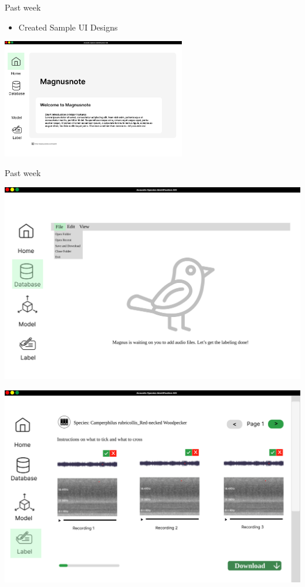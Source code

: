 \begin{frame}{Past week} 
    \begin{itemize}
        \item Created Sample UI Designs
    \end{itemize}  
    \centering
    \includegraphics[width=0.6\textwidth]{sampleui1.png}  
\end{frame}

\begin{frame}{Past week} 
    \begin{minipage}[b]{0.45\textwidth}
        \centering
        \includegraphics[width=\textwidth]{sampleui2.png}  
    \end{minipage}
    \hspace{0.05\textwidth}
    \begin{minipage}[b]{0.45\textwidth}
        \centering
        \includegraphics[width=\textwidth]{sampleui3.png} 
    \end{minipage}
\end{frame}

